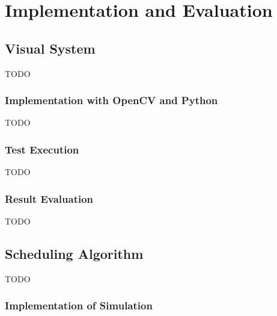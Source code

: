 \chapter{Implementation and Evaluation}
\label{chap:impl}


\section{Visual System}
TODO
\subsection{Implementation with OpenCV and Python}
TODO
\subsection{Test Execution}
TODO
\subsection{Result Evaluation}
TODO

\section{Scheduling Algorithm}
TODO
\subsection{Implementation of Simulation}

